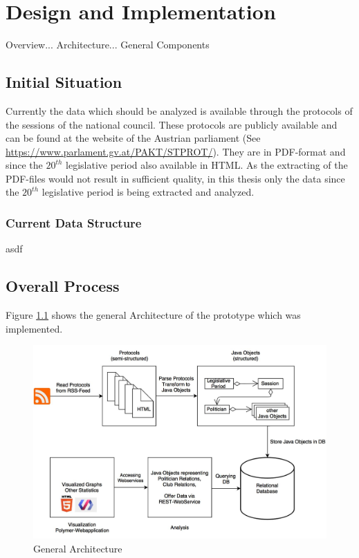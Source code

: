 \chapter{Design and Implementation}
\label{chap:implementation}

Overview... Architecture... General Components

\section{Initial Situation}
Currently the data which should be analyzed is available through the protocols of the sessions of the national council. These protocols are publicly available and can be found at the website of the Austrian parliament (See \url{https://www.parlament.gv.at/PAKT/STPROT/}). They are in PDF-format and since the $20^{th}$ legislative period also available in HTML. As the extracting of the PDF-files would not result in sufficient quality, in this thesis only the data since the $20^{th}$ legislative period is being extracted and analyzed.

\subsection{Current Data Structure}
asdf

\section{Overall Process}
Figure \ref{fig:general_architecture} shows the general Architecture of the prototype which was implemented.

\begin{figure}
	\centering
	\includegraphics[width=\textwidth]{imgs/overall_architecture}
	\caption{General Architecture}
	\label{fig:general_architecture}
\end{figure}

